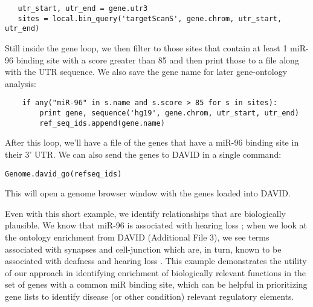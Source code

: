 \documentclass[10pt]{bmc_article}
\newenvironment{bmcformat}{\baselineskip20pt\sloppy\setboolean{publ}{false}}{\baselineskip20pt\sloppy}
\begin{document}
\begin{bmcformat}
\begin{verbatim}
   utr_start, utr_end = gene.utr3
   sites = local.bin_query('targetScanS', gene.chrom, utr_start, utr_end)
\end{verbatim}

Still inside the gene loop, we then filter to those sites that contain at least 1 miR-96 binding site with a score greater than 85 and then print those to a file along with the UTR sequence. We also save the gene name for later gene-ontology analysis:

\begin{verbatim}
    if any("miR-96" in s.name and s.score > 85 for s in sites):
        print gene, sequence('hg19', gene.chrom, utr_start, utr_end)
        ref_seq_ids.append(gene.name)
\end{verbatim}

After this loop, we’ll have a file of the genes that have a miR-96 binding site in their 3’ UTR. We can also send the genes to DAVID \cite{Huang} in a single command:

\begin{verbatim}
Genome.david_go(refseq_ids)
\end{verbatim}

This will open a genome browser window with the genes loaded into DAVID.

Even with this short example, we identify relationships that are biologically plausible. We know that miR-96 is associated with hearing loss \cite{Mencia}; when we look at the ontology enrichment from DAVID (Additional File 3), we see terms associated with synapses and cell-junction which are, in turn, known to be associated with deafness and hearing loss \cite{Martinez}. This example demonstrates the utility of our approach in identifying enrichment of biologically relevant functions in the set of genes with a common miR binding site, which can be helpful in prioritizing gene lists to identify disease (or other condition) relevant regulatory elements.


\end{bmcformat}
\end{document}
